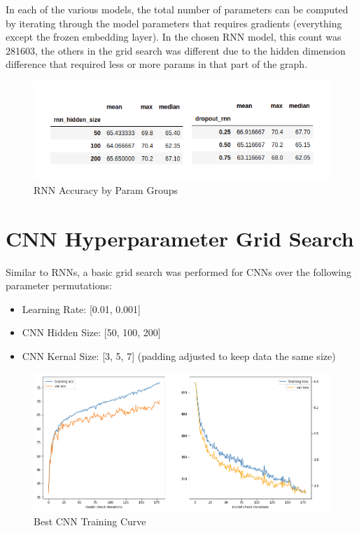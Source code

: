 \documentclass[a4paper,10pt]{article}
\begin{document}
\par 
\justify
In each of the various models, the total number of parameters can be computed by iterating through the model parameters that requires gradients (everything except the frozen embedding layer). In the chosen RNN model, this count was 281603, the others in the grid search was different due to the hidden dimension difference that required less or more params in that part of the graph.

\begin{figure}[h]
    \centering
    \includegraphics[scale=0.7]{rnn_params}
    \caption{RNN Accuracy by Param Groups}
    \label{fig:rnnparams}
\end{figure}


\section{CNN Hyperparameter Grid Search}
Similar to RNNs, a basic grid search was performed for CNNs over the following parameter permutations: 
\begin{itemize}
\item Learning Rate: [0.01, 0.001]
\item CNN Hidden Size: [50, 100, 200]
\item CNN Kernal Size: [3, 5, 7] (padding adjusted to keep data the same size)
\end{itemize}

\begin{figure}[h]
    \centering
    \includegraphics[scale=0.4]{cnn_best}
    \caption{Best CNN Training Curve}
    \label{fig:cnnbest}
\end{figure}
\end{document}

